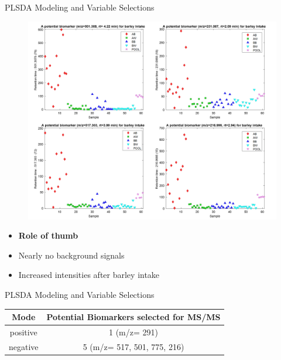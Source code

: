 \documentclass{beamer}
\begin{document}
\begin{frame}{PLSDA Modeling and Variable Selections}

\begin{figure}[H]
    \centering
    \includegraphics[scale=0.25]{images/barley_marker.png}

    \label{fig:selected}
\end{figure}


\begin{itemize}
\item \textbf{Role of thumb}
\item Nearly no background signals
\item Increased intensities after barley intake
\end{itemize}

\end{frame}

\begin{frame}{PLSDA Modeling and Variable Selections}

\begin{table}
\centering
\begin{tabular}{c|c}
Mode & Potential Biomarkers selected for MS/MS\\\hline
positive & 1 (m/z= 291) \\
negative & 5 (m/z= 517, 501, 775, 216)
\end{tabular}
\end{table}
\end{frame}


\end{document}
